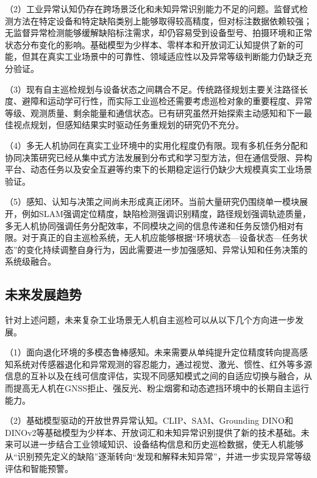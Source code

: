 （2）工业异常认知仍存在跨场景泛化和未知异常识别能力不足的问题。监督式检测方法在特定设备和特定缺陷类别上能够取得较高精度，但对标注数据依赖较强；无监督异常检测能够缓解缺陷标注需求，却仍容易受到设备型号、拍摄环境和正常状态分布变化的影响\cite{taox2021survey,roth2022towards,batzner2024efficientad}。基础模型为少样本、零样本和开放词汇认知提供了新的可能，但其在真实工业场景中的可靠性、领域适应性以及异常等级判断能力仍缺乏充分验证\cite{jeong2023winclip,kirillov2023segment,liu2024grounding,oquab2024dinov2}。

（3）现有自主巡检规划与设备状态之间耦合不足。传统路径规划主要关注路径长度、避障和运动学可行性，而实际工业巡检还需要考虑巡检对象的重要程度、异常等级、观测质量、剩余能量和通信状态。已有研究虽然开始探索主动感知和下一最佳视点规划，但感知结果实时驱动任务重规划的研究仍不充分\cite{bircher2016receding,placed2023active}。

（4）多无人机协同在真实工业环境中的实用化程度仍有限。现有多机任务分配和协同决策研究已经从集中式方法发展到分布式和学习型方法，但在通信受限、异构平台、动态任务以及安全互避等约束下的长期稳定运行仍缺少大规模真实工业场景验证\cite{choi2009consensus,biwh2024review,xiangjw2022key,zhou2023racer}。

（5）感知、认知与决策之间尚未形成真正闭环。当前大量研究仍围绕单一模块展开，例如SLAM强调定位精度，缺陷检测强调识别精度，路径规划强调轨迹质量，多无人机协同强调任务分配效率，不同模块之间的信息传递和任务反馈仍相对有限。对于真正的自主巡检系统，无人机应能够根据“环境状态—设备状态—任务状态”的变化持续调整自身行为，因此需要进一步加强感知、异常认知和任务决策的系统级融合。

\subsection{未来发展趋势}

针对上述问题，未来复杂工业场景无人机自主巡检可以从以下几个方向进一步发展。

（1）面向退化环境的多模态鲁棒感知。未来需要从单纯提升定位精度转向提高感知系统对传感器退化和异常观测的容忍能力，通过视觉、激光、惯性、红外等多源信息的互补以及在线可信度评估，实现不同感知模式之间的自适应切换与融合，从而提高无人机在GNSS拒止、强反光、粉尘烟雾和动态遮挡环境中的长期自主运行能力。

（2）基础模型驱动的开放世界异常认知。CLIP、SAM、Grounding DINO和DINOv2等基础模型为少样本、开放词汇和未知异常识别提供了新的技术基础\cite{radford2021learning,kirillov2023segment,liu2024grounding,oquab2024dinov2}。未来可以进一步结合工业领域知识、设备结构信息和历史巡检数据，使无人机能够从“识别预先定义的缺陷”逐渐转向“发现和解释未知异常”，并进一步实现异常等级评估和智能预警。

